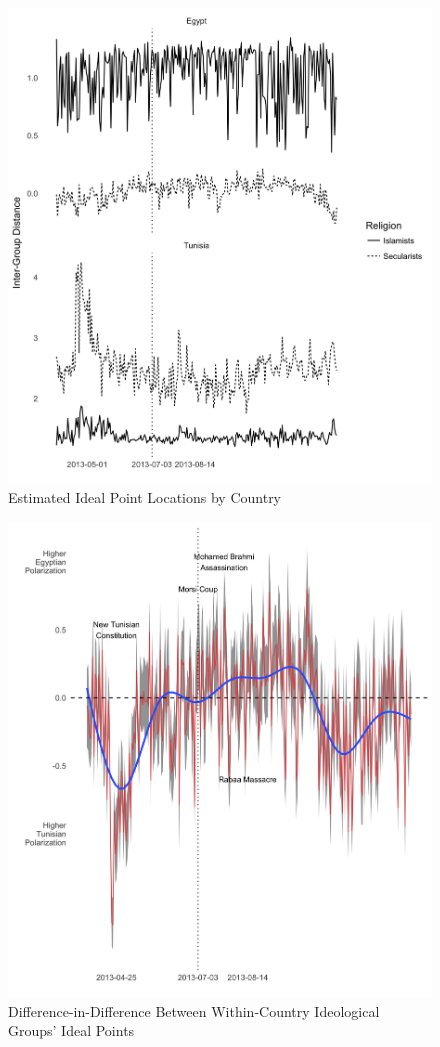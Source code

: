 \documentclass[12pt]{article}
\begin{document}
 \begin{figure}[!h]
 	\centering
	\caption{Estimated Ideal Point Locations by Country}\label{country_facet}
	\centering
	\includegraphics[width=.9\linewidth]{country_coint}
\end{figure}
 \begin{figure}[!h]
	\centering
	\caption{Difference-in-Difference Between Within-Country Ideological Groups' Ideal Points}\label{diffindiff}
	\centering
	\includegraphics[width=.9\linewidth]{diff_ideal}
\end{figure}
\end{document}
